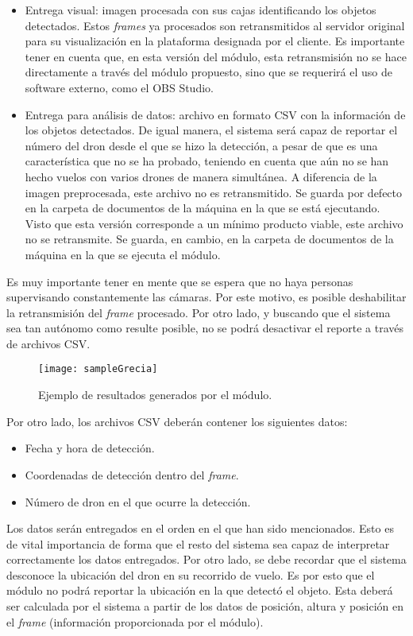 \begin{itemize}

	\item Entrega visual: imagen procesada con sus cajas identificando los objetos detectados. Estos \textit{frames} ya procesados son retransmitidos al servidor original para su visualización en la plataforma designada por el cliente. Es importante tener en cuenta que, en esta versión del módulo, esta retransmisión no se hace directamente a través del módulo propuesto, sino que se requerirá el uso de software externo, como el OBS Studio. 
	\item Entrega para análisis de datos: archivo en formato CSV con la información de los objetos detectados. De igual manera, el sistema será capaz de reportar el número del dron desde el que se hizo la detección, a pesar de que es una característica que no se ha probado, teniendo en cuenta que aún no se han hecho vuelos con varios drones de manera simultánea. A diferencia de la imagen preprocesada, este archivo no es retransmitido. Se guarda por defecto en la carpeta de documentos de la máquina en la que se está ejecutando. Visto que esta versión corresponde a un mínimo producto viable, este archivo no se retransmite. Se guarda, en cambio, en la carpeta de documentos de la máquina en la que se ejecuta el módulo. 

\end{itemize}

Es muy importante tener en mente que se espera que no haya personas supervisando constantemente las cámaras. Por este motivo, es posible deshabilitar la retransmisión del \textit{frame} procesado. Por otro lado, y buscando que el sistema sea tan autónomo como resulte posible, no se podrá desactivar el reporte a través de archivos CSV.

\begin{figure}[!ht]
    \centering
    \texttt{[image: sampleGrecia]}
    \caption{Ejemplo de resultados generados por el módulo.}
    \label{fig:grecia}
\end{figure}



Por otro lado, los archivos CSV deberán contener los siguientes datos:

\begin{itemize}
	\item Fecha y hora de detección.
	\item Coordenadas de detección dentro del \textit{frame}.
	\item Número de dron en el que ocurre la detección.
\end{itemize}

Los datos serán entregados en el orden en el que han sido mencionados. Esto es de vital importancia de forma que el resto del sistema sea capaz de interpretar correctamente los datos entregados. Por otro lado, se debe recordar que el sistema desconoce la ubicación del dron en su recorrido de vuelo. Es por esto que el módulo no podrá reportar la ubicación en la que detectó el objeto. Esta deberá ser calculada por el sistema a partir de los datos de posición, altura y posición en el \textit{frame} (información proporcionada por el módulo).